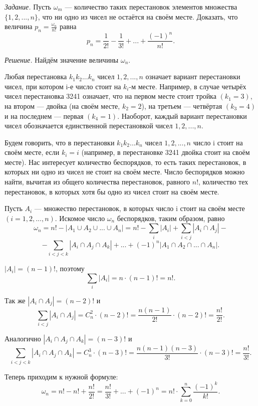 \documentclass{book}
\begin{document}
\textit{Задание.} Пусть $\omega_m$ --- количество таких перестановок элементов множества $\{1, 2, ..., n\}$, что ни одно из чисел не остаётся на своём месте. Доказать, что величина $p_n=\frac{\omega_n}{n!}$ равна $$p_n=\frac{1}{2!}-\frac{1}{3!}+...+\frac{\left(-1\right)^n}{n!}.$$

\textit{Решение.} Найдём значение величины $\omega_n$.

Любая перестановка $k_1k_2...k_n$ чисел $1, 2, ..., n$ означает вариант перестановки чисел, при котором i-е число стоит на $k_i$-м месте. Например, в случае четырёх чисел перестановка 3241 означает, что на первом месте стоит тройка $\left(k_1=3\right)$, на втором --- двойка (на своём месте, $k_2=2$), на третьем --- четвёртая $\left(k_3=4\right)$ и на последнем --- первая $\left(k_4=1\right)$. Наоборот, каждый вариант перестановки чисел обозначается единственной перестановкой чисел $1, 2, ..., n$.

Будем говорить, что в перестановки $k_1k_2...k_n$ чисел $1, 2, ..., n$ число i стоит на своём месте, если $k_i=i$ (например, в перестановке 3241 двойка стоит на своём месте). Нас интересует количество беспорядков, то есть таких перестановок, в которых ни одно из чисел не стоит на своём месте. Число беспорядков можно найти, вычитая из общего количества перестановок, равного $n!$, количество тех перестановок, в которых хотя бы одно из чисел стоит на своём месте.

Пусть $A_i$ --- множество перестановок, в которых число i стоит на своём месте $\left(i=1, 2, ..., n\right)$. Искомое число $\omega_n$ беспорядков, таким образом, равно $$\omega_n=n!-|A_1\cup A_2\cup...\cup A_n|=n!-\sum\limits_i|A_i|+\sum\limits_{i<j}|A_i\cap A_j|-$$$$-\sum\limits_{i<j<k}|A_i\cap A_j\cap A_k|+...+\left(-1\right)^n|A_1\cap A_2\cap...\cap A_n|.$$

$|A_i|=\left(n-1\right)!$, поэтому $$\sum\limits_i|A_i|=n\cdot\left(n-1\right)!=n!.$$

Так же $|A_i\cap A_j|=\left(n-2\right)!$ и $$\sum\limits_{i<j}|A_i\cap A_j|=C_n^2\cdot\left(n-2\right)!=\frac{n\left(n-1\right)}{2!}\cdot\left(n-2\right)!=\frac{n!}{2!}.$$

Аналогично $|A_i\cap A_j\cap A_k|=\left(n-3\right)!$ и $$\sum\limits_{i<j<k}|A_i\cap A_j\cap A_k|=C_n^3\cdot\left(n-3\right)!=\frac{n\left(n-1\right)\left(n-3\right)}{3!}\cdot\left(n-3\right)!=\frac{n!}{3!}.$$

Теперь приходим к нужной формуле: $$\omega_n=n!-n!+\frac{n!}{2!}=\frac{n!}{3!}+...+\left(-1\right)^n=n!\cdot\sum\limits_{k=0}^n\frac{\left(-1\right)^k}{k!}.$$
\end{document}
